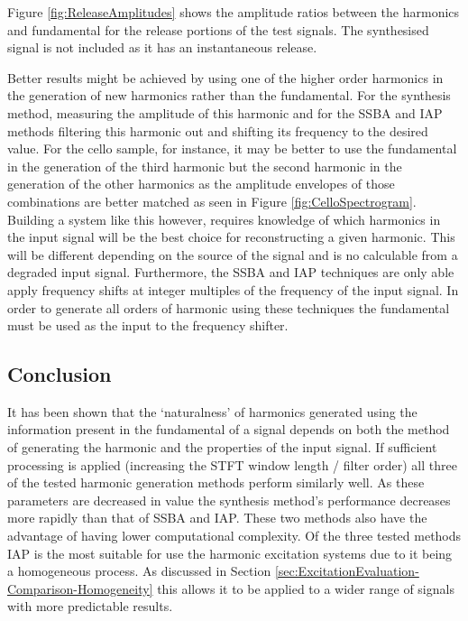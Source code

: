 		Figure \ref{fig:ReleaseAmplitudes} shows the amplitude ratios between the harmonics and fundamental for the
		release portions of the test signals. The synthesised signal is not included as it has an instantaneous
		release.

		Better results might be achieved by using one of the higher order harmonics in the generation of new
		harmonics rather than the fundamental. For the synthesis method, measuring the amplitude of this harmonic
		and for the SSBA and IAP methods filtering this harmonic out and shifting its frequency to the desired
		value. For the cello sample, for instance, it may be better to use the fundamental in the generation of the
		third harmonic but the second harmonic in the generation of the other harmonics as the amplitude envelopes
		of those combinations are better matched as seen in Figure \ref{fig:CelloSpectrogram}. Building a system
		like this however, requires knowledge of which harmonics in the input signal will be the best choice for
		reconstructing a given harmonic. This will be different depending on the source of the signal and is no
		calculable from a degraded input signal. Furthermore, the SSBA and IAP techniques are only able apply
		frequency shifts at integer multiples of the frequency of the input signal. In order to generate all orders
		of harmonic using these techniques the fundamental must be used as the input to the frequency shifter.
%

	\subsection{Conclusion}
	\label{sec:PerceptualExperiments-Reconstruction-Conclusion}
		It has been shown that the `naturalness' of harmonics generated using the information present in the
		fundamental of a signal depends on both the method of generating the harmonic and the properties of the
		input signal. If sufficient processing is applied (increasing the STFT window length / filter order) all
		three of the tested harmonic generation methods perform similarly well. As these parameters are decreased
		in value the synthesis method's performance decreases more rapidly than that of SSBA and IAP. These two
		methods also have the advantage of having lower computational complexity. Of the three tested methods IAP
		is the most suitable for use the harmonic excitation systems due to it being a homogeneous process. As
		discussed in Section \ref{sec:ExcitationEvaluation-Comparison-Homogeneity} this allows it to be applied to
		a wider range of signals with more predictable results.

